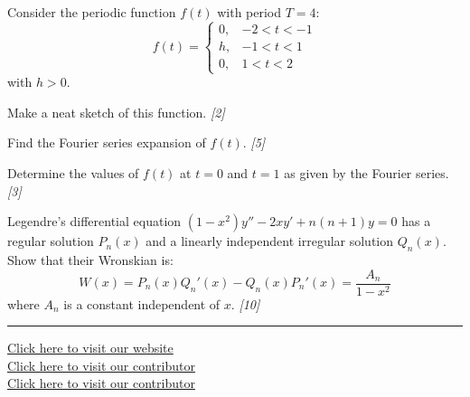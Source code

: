 \documentclass[11pt,a4paper]{article}
\newcommand{\pts}[1]{\hfill   \textit{[#1]}}
\begin{document}
\begin{parts}
  \item Consider the periodic function $f(t)$ with period $T = 4$:
    \[ f(t) = 
\begin{cases} 0, & -2 < t < -1 \\ h, & -1 < t < 1 \\ 0, & 1 < t < 2 \end{cases} \]
    with $h > 0$.
    
\begin{parts}
      \item Make a neat sketch of this function. \pts{2}
      \item Find the Fourier series expansion of $f(t)$. \pts{5}
      \item Determine the values of $f(t)$ at $t = 0$ and $t = 1$ as given by the Fourier series. \pts{3}
    \end{parts}
  \item Legendre's differential equation $(1-x^2) y'' - 2xy' + n(n+1)y = 0$ has a regular solution $P_n(x)$ and a linearly independent irregular solution $Q_n(x)$. Show that their Wronskian is:
    \[ W(x) = P_n(x) Q_n'(x) - Q_n(x) P_n'(x) = \frac{A_n}{1-x^2} \]
    where $A_n$ is a constant independent of $x$. \pts{10}
\end{parts}

\vfill
\rule{\linewidth}{0.4pt}

\begin{center}\small
  \href{https://bhu-exam.vercel.app/}{Click here to visit our website}\\[4pt]
  \href{https://me-aryan.vercel.app/}{Click here to visit our contributor}\\[4pt]
  \href{https://quashan-me.vercel.app/}{Click here to visit our contributor}
\end{center}
\end{document}
